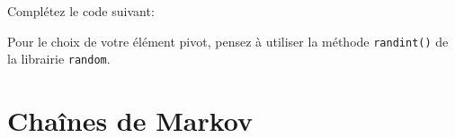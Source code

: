 \begin{Exercice}[10 minutes]
    Complétez le code suivant:
    


    \begin{conseil}
        Pour le choix de votre élément pivot, pensez à utiliser la méthode \lstinline{randint()} de la librairie \lstinline{random}.
    \end{conseil}


    \begin{solution}
        
    \end{solution}
     


\end{Exercice}
\newpage
\section{Chaînes de Markov}

